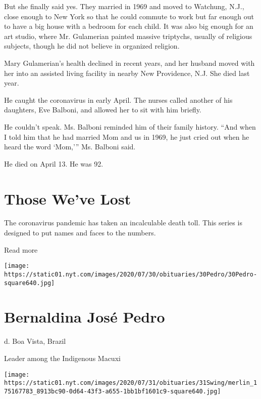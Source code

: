 But she finally said yes. They married in 1969 and moved to Watchung,
N.J., close enough to New York so that he could commute to work but far
enough out to have a big house with a bedroom for each child. It was
also big enough for an art studio, where Mr. Gulamerian painted massive
triptychs, usually of religious subjects, though he did not believe in
organized religion.

Mary Gulamerian's health declined in recent years, and her husband moved
with her into an assisted living facility in nearby New Providence, N.J.
She died last year.

He caught the coronavirus in early April. The nurses called another of
his daughters, Eve Balboni, and allowed her to sit with him briefly.

He couldn't speak. Ms. Balboni reminded him of their family history.
``And when I told him that he had married Mom and us in 1969, he just
cried out when he heard the word `Mom,''' Ms. Balboni said.

He died on April 13. He was 92.

\href{https://www.nytimes.com/interactive/2020/obituaries/people-died-coronavirus-obituaries.html?action=click\&pgtype=Article\&state=default\&region=BELOW_MAIN_CONTENT\&context=covid_obits_promo}{}

\hypertarget{those-weve-lost}{%
\section{Those We've Lost}\label{those-weve-lost}}

The coronavirus pandemic has taken an incalculable death toll. This
series is designed to put names and faces to the numbers.

Read more

\texttt{[image: https://static01.nyt.com/images/2020/07/30/obituaries/30Pedro/30Pedro-square640.jpg]}

\hypertarget{bernaldina-josuxe9-pedro}{%
\section{Bernaldina José Pedro}\label{bernaldina-josuxe9-pedro}}

d. Boa Vista, Brazil

Leader among the Indigenous Macuxi

\texttt{[image: https://static01.nyt.com/images/2020/07/31/obituaries/31Swing/merlin\_175167783\_8913bc90-0d64-43f3-a655-1bb1bf1601c9-square640.jpg]}


